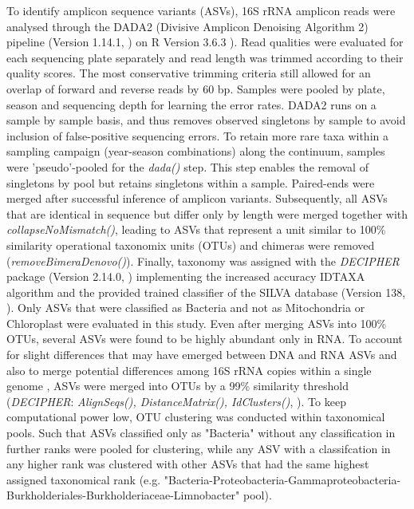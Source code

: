 \documentclass[12pt,a4paper]{article} %
\begin{document}
To identify amplicon sequence variants (ASVs), 16S rRNA amplicon reads were analysed through the DADA2 (Divisive Amplicon Denoising Algorithm 2) pipeline (Version 1.14.1, \citet{Callahan2017}) on R Version 3.6.3 \citep{RCoreTeam2017}). Read qualities were evaluated for each sequencing plate separately and read length was trimmed according to their quality scores. The most conservative trimming criteria still allowed for an overlap of forward and reverse reads by 60 bp. Samples were pooled by plate, season and sequencing depth for learning the error rates. DADA2 runs on a sample by sample basis, and thus removes observed singletons by sample to avoid inclusion of false-positive sequencing errors. To retain more rare taxa within a sampling campaign (year-season combinations) along the continuum, samples were 'pseudo'-pooled for the \textit{dada()} step.  This step enables the removal of singletons by pool but retains singletons within a sample. Paired-ends were merged after successful inference of amplicon variants. Subsequently, all ASVs that are identical in sequence but differ only by length were merged together with \textit{collapseNoMismatch()}, leading to ASVs that represent a unit similar to 100\% similarity operational taxonomix units (OTUs) and chimeras were removed (\textit{removeBimeraDenovo()}). Finally, taxonomy was assigned with the \textit{DECIPHER} package (Version 2.14.0, \citet{Wright2016}) implementing the increased accuracy IDTAXA algorithm \citep{Murali2018} and the provided trained classifier of the SILVA database (Version 138, \citet{Pruesse2007}). Only ASVs that were classified as Bacteria and not as Mitochondria or Chloroplast were evaluated in this study. Even after merging ASVs into 100\% OTUs, several ASVs were found to be highly abundant only in RNA. To account for slight differences that may have emerged between DNA and RNA ASVs and also to merge potential differences among 16S rRNA copies within a single genome \citep{Vetrovsky2013a}, ASVs were merged into OTUs by a 99\% similarity threshold (\textit{DECIPHER}: \textit{AlignSeqs(), DistanceMatrix(), IdClusters()}, \citet{Wright2016}). To keep computational power low, OTU clustering was conducted within taxonomical pools. Such that ASVs classified only as "Bacteria" without any classification in further ranks were pooled for clustering, while any ASV with a classifcation in any higher rank was clustered with other ASVs that had the same highest assigned taxonomical rank (e.g. "Bacteria-Proteobacteria-Gammaproteobacteria-Burkholderiales-Burkholderiaceae-Limnobacter" pool).
\end{document}
